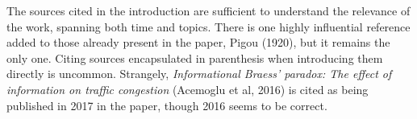 \documentclass[../review.tex]{subfiles}
\begin{document}
The sources cited in the introduction are sufficient to understand the relevance of the work, spanning both time and topics. There is one highly influential reference added to those already present in the paper, Pigou (1920), but it remains the only one. Citing sources encapsulated in parenthesis when introducing them directly is uncommon. Strangely, \textit{Informational Braess' paradox: The
effect of information on traffic congestion} (Acemoglu et al, 2016) is cited as being published in 2017 in the paper, though 2016 seems to be correct.
\end{document}

